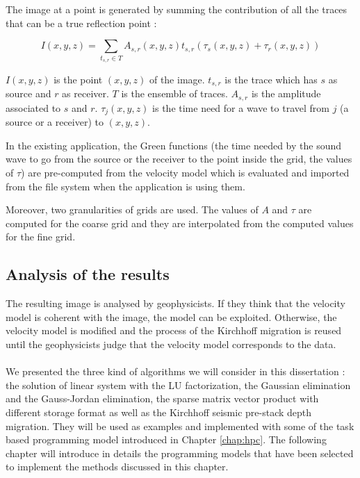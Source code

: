 The image at a point is generated by summing the contribution of all the traces that can be a true reflection point :


\begin{equation}
	I(x,y,z)=\sum_{t_{s,r} \in T}A_{s,r}(x,y,z)t_{s,r}(\tau_s(x,y,z) + \tau_r(x,y,z))
\end{equation}

$I(x,y,z)$ is the point $(x,y,z)$ of the image.
$t_{s,r}$ is the trace which has $s$ as source and $r$ as receiver.
$T$ is the ensemble of traces.
$A_{s,r}$ is the amplitude associated to $s$ and $r$.
$\tau_j(x,y,z)$  is the time need for a wave to travel from $j$ (a source or a receiver) to $(x,y,z)$.


In the existing application, the Green functions (the time needed by the sound wave to go from the source or the receiver to the point inside the grid, the values of $\tau$) are pre-computed from the velocity model which is evaluated and imported from the file system when the application is using them.

Moreover, two granularities of grids are used.
The values of $A$ and $\tau$ are computed for the coarse grid and they are interpolated from the computed values for the fine grid.


\subsection{Analysis of the results}
The resulting image is analysed by geophysicists.
If they think that the velocity model is coherent with the image, the model can be exploited.
Otherwise, the velocity model is modified and the process of the Kirchhoff migration is reused until the geophysicists judge that the velocity model corresponds to the data.

\paragraph{}
We presented the three kind of algorithms we will consider in this dissertation : the solution of linear system with the LU factorization, the Gaussian elimination and the Gauss-Jordan elimination, the sparse matrix vector product with different storage format as well as the Kirchhoff seismic pre-stack depth migration.
They will be used as examples and implemented with some of the task based programming model introduced in Chapter \ref{chap:hpc}.
The following chapter will introduce in details the programming models that have been selected to implement the methods discussed in this chapter.

